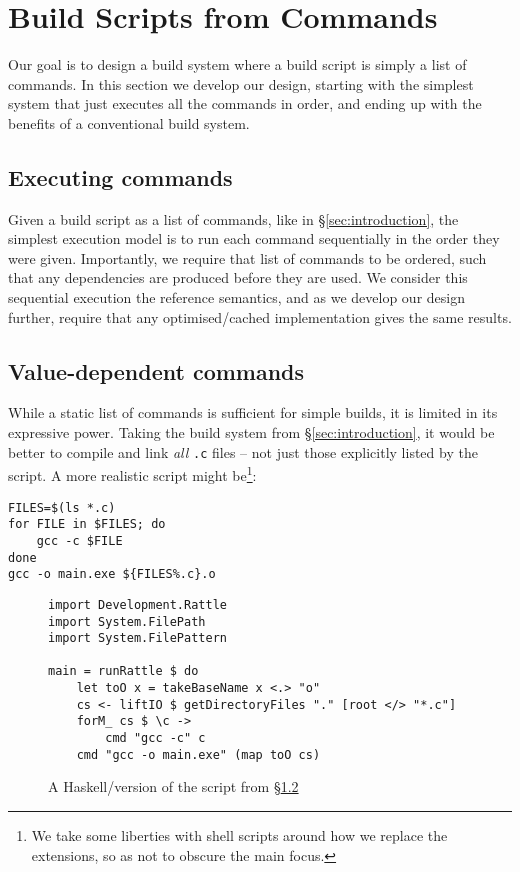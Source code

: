 \section{Build Scripts from Commands}
\label{sec:design}

Our goal is to design a build system where a build script is simply a list of commands. In this section we develop our design, starting with the simplest system that just executes all the commands in order, and ending up with the benefits of a conventional build system.

\subsection{Executing commands}
\label{sec:executing_commands}

Given a build script as a list of commands, like in \S\ref{sec:introduction}, the simplest execution model is to run each command sequentially in the order they were given. Importantly, we require that list of commands to be ordered, such that any dependencies are produced before they are used. We consider this sequential execution the reference semantics, and as we develop our design further, require that any optimised/cached implementation gives the same results.

\subsection{Value-dependent commands}
\label{sec:monadic}

While a static list of commands is sufficient for simple builds, it is limited in its expressive power. Taking the build system from \S\ref{sec:introduction}, it would be better to compile and link \emph{all} \texttt{.c} files -- not just those explicitly listed by the script. A more realistic script might be\footnote{We take some liberties with shell scripts around how we replace the extensions, so as not to obscure the main focus.}:

\vspace{3mm}
\begin{verbatim}
FILES=$(ls *.c)
for FILE in $FILES; do
    gcc -c $FILE
done
gcc -o main.exe ${FILES%.c}.o
\end{verbatim}
\vspace{3mm}

\begin{figure}
\begin{verbatim}
import Development.Rattle
import System.FilePath
import System.FilePattern

main = runRattle $ do
    let toO x = takeBaseName x <.> "o"
    cs <- liftIO $ getDirectoryFiles "." [root </> "*.c"]
    forM_ cs $ \c ->
        cmd "gcc -c" c
    cmd "gcc -o main.exe" (map toO cs)
\end{verbatim}
\caption{A Haskell/\Rattle version of the script from \S\ref{sec:monadic}}
\label{fig:monadic}
\end{figure}


